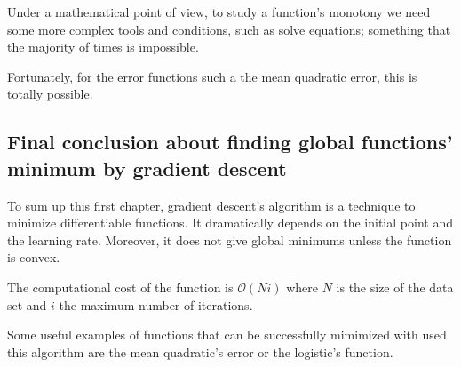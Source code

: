 Under a mathematical point of view, to study a function's monotony we need some more complex tools and conditions, such as solve equations; something that
the majority of times is impossible.

Fortunately, for the error functions such a the mean quadratic error, this is totally possible. 



\subsection{ Final conclusion about finding global functions' minimum by gradient descent}  

To sum up this first chapter,  gradient descent's algorithm is a technique to minimize differentiable functions. It dramatically depends  on the initial point and the learning rate. Moreover, it does not give global  minimums unless the  function is convex.

The computational cost of the function is $\mathcal O (N i)$ where $N$ is the size of the data set and $i$ the maximum number of iterations.

Some useful examples of functions that can be successfully mimimized with used this algorithm are the mean quadratic's error or the logistic's function.



